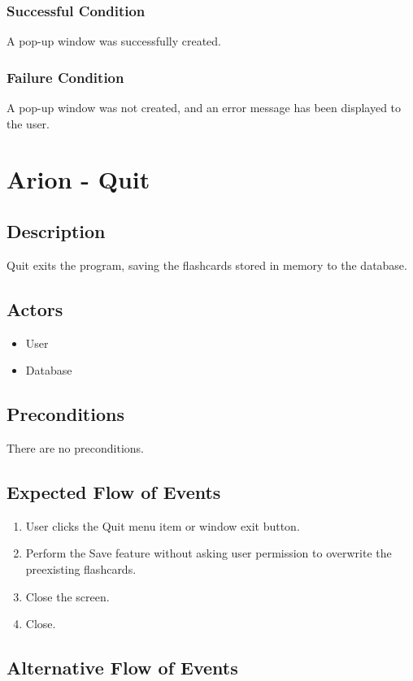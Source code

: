 \documentclass{scrreprt}
\begin{document}
    \subsection{Successful Condition}
    A pop-up window was successfully created.
    
    \subsection{Failure Condition}
    A pop-up window was not created, and an error message has been displayed to the user.


\chapter{Arion - Quit}

\section{Description}
Quit exits the program, saving the flashcards stored in memory to the database.

\section{Actors}
\begin{itemize}
    \item User
    \item Database
\end{itemize}

\section{Preconditions}
There are no preconditions.

\section{Expected Flow of Events}
    \begin{enumerate}[1.]
        \item User clicks the Quit menu item or window exit button.
        \item Perform the Save feature without asking user permission to overwrite the preexisting flashcards.
        \item Close the screen.
        \item Close.
    \end{enumerate}

\section{Alternative Flow of Events}
\end{document}
